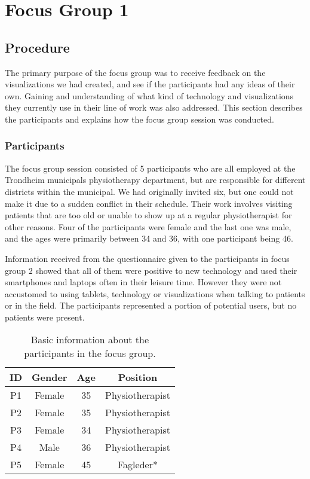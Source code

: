 \chapter{Focus Group 1}
\label{ch:focusGroup1}

\section{Procedure}
The primary purpose of the focus group was to receive feedback on the visualizations we had created, and see if the participants had any ideas of their own. Gaining and understanding of what kind of technology and visualizations they currently use in their line of work was also addressed. This section describes the participants and explains how the focus group session was conducted.

\subsection{Participants}
The focus group session consisted of 5 participants who are all employed at the Trondheim municipals physiotherapy department, but are responsible for different districts within the municipal. We had originally invited six, but one could not make it due to a sudden conflict in their schedule. Their work involves visiting patients that are too old or unable to show up at a regular physiotherapist for other reasons. Four of the participants were female and the last one was male, and the ages were primarily between 34 and 36, with one participant being 46. 

Information received from the questionnaire given to the participants in focus group 2 showed that all of them were positive to new technology and used their smartphones and laptops often in their leisure time. However they were not accustomed to using tablets, technology or visualizations when talking to patients or in the field. The participants represented a portion of potential users, but no patients were present.

\begin{table}[h!]
  \begin{center}
  \begin{tabular}{|c|c|c|c|}
    \hline
    \textbf{ID} & \textbf{Gender} & \textbf{Age} & \textbf{Position} \\ \hline
    P1 & Female & 35 & Physiotherapist \\ \hline
    P2 & Female & 35 & Physiotherapist \\ \hline
    P3 & Female & 34 & Physiotherapist \\ \hline
    P4 & Male & 36 & Physiotherapist \\ \hline
    P5 & Female & 45 & Fagleder* \\ \hline
  \end{tabular}
  \end{center}
  \caption{Basic information about the participants in the focus group.}
  \label{tab:participants}
\end{table}

